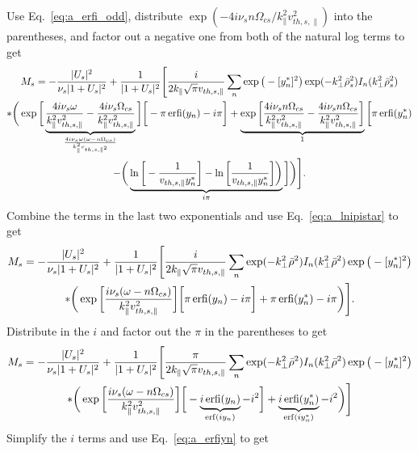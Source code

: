 Use Eq.~\ref{eq:a_erfi_odd}, distribute $\exp(-4i\nu_sn\Omega_{cs}/k_\parallel^2v_{th,s,\parallel}^2)$ into the parentheses,
and factor out a negative one from both of the natural log terms to get
\begin{multline}
	M_s = -\frac{|U_s|^2}{\nu_s|1+U_s|^2} + \frac{1}{|1+U_s|^2} \Bigg[
	\frac{i}{2 k_\parallel \sqrt{\pi} v_{th,s,\parallel}} \sum_n
	\exp\big(-[y_n^*]^2\big) \exp(-k_\perp^2\bar{\rho}_s^2) I_n(k_\perp^2 \bar{\rho}_s^2)\\
	* \bigg( \exp \bigg[ \underbrace{\frac{4i\nu_s\omega}{k_\parallel^2 v_{th,s,\parallel}^2} - 
		\frac{4i\nu_s\Omega_{cs}}{k_\parallel^2v_{th,s,\parallel}^2}}_{\frac{4i\nu_s\omega (\omega - n\Omega_{cs})}{k_\parallel^2v_{th,s,\parallel^2}}} \bigg]
	\bigg[ -\pi \operatorname{erfi}(y_n) - i \pi \bigg]
	+ \underbrace{\exp\bigg[ \frac{4i\nu_sn\Omega_{cs}}{k_\parallel^2 v_{th,s,\parallel}^2} - \frac{4i\nu_s n\Omega_{cs}}{k_\parallel^2 v_{th,s,\parallel}^2} \bigg]}_{1}
	\bigg[ \pi \operatorname{erfi}(y_n^*) \\
	- \bigg( \underbrace{\ln \bigg[ -\frac{1}{v_{th,s,\parallel}y_n^*}\bigg] - \ln \bigg[\frac{1}{v_{th,s,\parallel}y_n^*}\bigg]  \bigg) }_{i\pi}\bigg]
	\bigg)
	\Bigg].
\end{multline}
Combine the terms in the last two exponentials and use Eq.~\ref{eq:a_lnipistar} to get
\begin{multline}
	M_s = -\frac{|U_s|^2}{\nu_s|1+U_s|^2} + \frac{1}{|1+U_s|^2} 
	\Bigg[ \frac{i}{2 k_\parallel \sqrt{\pi} v_{th,s,\parallel}} 
	\sum_n \exp(-k_\perp^2\bar{\rho}^2) I_n(k_\perp^2\bar{\rho}^2)\exp\big( -[y_n^*]^2\big) 	\\
	* \bigg( \exp \bigg[ \frac{i\nu_s (\omega-n\Omega_{cs})}{k_\parallel^2v_{th,s,\parallel}^2} \bigg] 
	\bigg[ \pi \operatorname{erfi}(y_n) - i \pi\bigg] + \pi \operatorname{erfi}(y_n^*) - i \pi \bigg)
	\Bigg].
\end{multline}
Distribute in the $i$ and factor out the $\pi$ in the parentheses to get
\begin{multline}
	M_s = -\frac{|U_s|^2}{\nu_s|1+U_s|^2} + \frac{1}{|1+U_s|^2} 
	\Bigg[ \frac{\pi}{2 k_\parallel \sqrt{\pi} v_{th,s,\parallel}}
	\sum_n \exp(-k_\perp^2\bar{\rho}^2) I_n(k_\perp^2\bar{\rho}^2)\exp\big( -[y_n^*]^2\big) 	\\
	* \bigg( \exp \bigg[ \frac{i\nu_s (\omega-n\Omega_{cs})}{k_\parallel^2v_{th,s,\parallel}^2} \bigg] 
	\bigg[ - \underbrace{ i \operatorname{erfi}(y_n)}_{\operatorname{erf}(iy_n)} - i^2 \bigg] + \underbrace{i \operatorname{erfi}(y_n^*)}_{\operatorname{erf}(iy_n^*)} - i^2 \bigg)
	\Bigg]
\end{multline}
Simplify the $i$ terms and use Eq.~\ref{eq:a_erfiyn} to get
